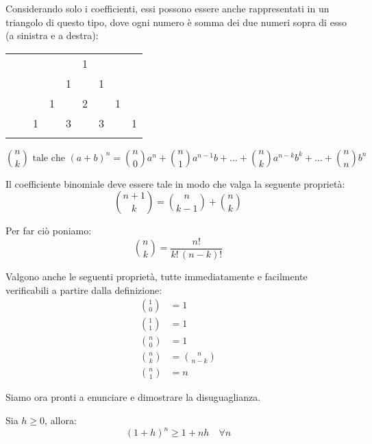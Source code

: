 Considerando solo i coefficienti, essi possono essere anche rappresentati in un triangolo di questo tipo, dove ogni numero è somma dei due numeri sopra di esso (a sinistra e a destra): 
\begin{center}
\begin{tabular}{ccccccccc}
&    &    &    &    &  1\\\noalign{\smallskip\smallskip}
&    &    &    &  1 &    &  1\\\noalign{\smallskip\smallskip}
&    &    &  1 &    &  2 &    &  1\\\noalign{\smallskip\smallskip}
&    &  1 &    &  3 &    &  3 &    &  1\\\noalign{\smallskip\smallskip}
\end{tabular}
\end{center}

\begin{definition}
\begin{equation*}
\binom{n}{k} \text { tale che } (a+b)^n = \binom{n}{0}a^n + \binom{n}{1}a^{n-1}b + \ldots + \binom{n}{k}a^{n-k}b^k + \ldots + \binom{n}{n}b^n
\end{equation*}
\end{definition}

Il coefficiente binomiale deve essere tale in modo che valga la seguente proprietà:
\begin{equation*}
\binom{n+1}{k} = \binom{n}{k-1} + \binom{n}{k}
\end{equation*}

Per far ciò poniamo:
\begin{equation*}
\binom{n}{k} = \frac{n!}{k! \, (n-k)!}
\end{equation*}

Valgono anche le seguenti proprietà, tutte immediatamente e facilmente verificabili a partire dalla definizione:
\begin{align*}
\binom{1}{0} &= 1 \\
\binom{1}{1} &= 1 \\
\binom{n}{0} &= 1 \\
\binom{n}{k} &= \binom{n}{n-k} \\
\binom{n}{1} &= n 
\end{align*}

Siamo ora pronti a enunciare e dimostrare la disuguaglianza.

\begin{theorem}
Sia $h \ge 0$, allora:
\begin{equation*}
(1+h)^n \ge 1 + nh \quad \forall n
\end{equation*}
\end{theorem}

